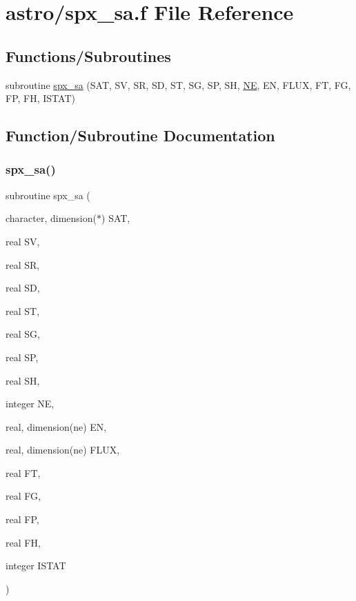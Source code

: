 \hypertarget{spx__sa_8f}{}\section{astro/spx\+\_\+sa.f File Reference}
\label{spx__sa_8f}
\subsection*{Functions/\+Subroutines}
\begin{DoxyCompactItemize}
\item 
subroutine \hyperlink{spx__sa_8f_a07864ae4cf5116f2c3cf6bd13abb9774}{spx\+\_\+sa} (S\+AT, SV, SR, SD, ST, SG, SP, SH, \hyperlink{eval__tab_8h_a5af9139e882aef6c820ae908589a40d6}{NE}, EN, F\+L\+UX, FT, FG, FP, FH, I\+S\+T\+AT)
\end{DoxyCompactItemize}


\subsection{Function/\+Subroutine Documentation}
\mbox{\label{spx__sa_8f_a07864ae4cf5116f2c3cf6bd13abb9774}} 
\subsubsection{\texorpdfstring{spx\+\_\+sa()}{spx\_sa()}}
{\footnotesize\ttfamily subroutine spx\+\_\+sa (\begin{DoxyParamCaption}\item[{character, dimension($\ast$)}]{S\+AT,  }\item[{real}]{SV,  }\item[{real}]{SR,  }\item[{real}]{SD,  }\item[{real}]{ST,  }\item[{real}]{SG,  }\item[{real}]{SP,  }\item[{real}]{SH,  }\item[{integer}]{NE,  }\item[{real, dimension(ne)}]{EN,  }\item[{real, dimension(ne)}]{F\+L\+UX,  }\item[{real}]{FT,  }\item[{real}]{FG,  }\item[{real}]{FP,  }\item[{real}]{FH,  }\item[{integer}]{I\+S\+T\+AT }\end{DoxyParamCaption})}

